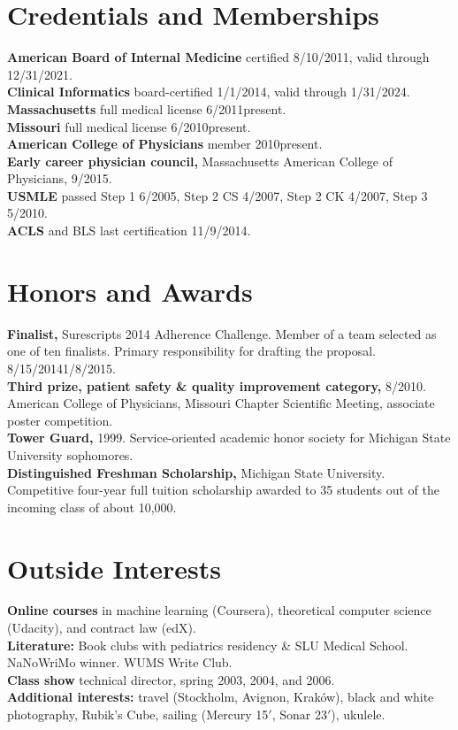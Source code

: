 \documentclass[10pt]{article}
\begin{document}
\section*{Credentials and Memberships}
\textbf{American Board of Internal Medicine} certified 8/10/2011,
valid through 12/31/2021.\\
\textbf{Clinical Informatics} board-certified 1/1/2014, valid through
1/31/2024.\\
\textbf{Massachusetts} full medical license 6/2011\ndash{}present.\\
\textbf{Missouri} full medical license 6/2010\ndash{}present.\\
\textbf{American College of Physicians} member 2010\ndash{}present.\\
\textbf{Early career physician council,} Massachusetts American
College of Physicians, 9/\ndash{}2015.\\
\textbf{USMLE} passed Step 1 6/2005, Step 2 CS 4/2007, Step 2 CK
4/2007, Step 3 5/2010.\\
\textbf{ACLS} and BLS last certification 11/9/2014.

\section*{Honors and Awards}

\textbf{Finalist,} Surescripts 2014 Adherence Challenge. Member of a
team selected as one of ten finalists. Primary responsibility for
drafting the proposal. 8/15/2014\ndash{}1/8/2015.\\
\textbf{Third prize, patient safety \& quality improvement category,}
8/2010. American College of Physicians, Missouri Chapter Scientific
Meeting, associate poster competition.\\
\textbf{Tower Guard,} 1999. Service-oriented academic honor
society for Michigan State University sophomores.\\
\textbf{Distinguished Freshman Scholarship,} Michigan State
University. Competitive four-year full tuition scholarship awarded to
35 students out of the incoming class of about 10,000.

\section*{Outside Interests}

\textbf{Online courses} in machine learning (Coursera), theoretical
computer science (Udacity), and contract law (edX).\\
\textbf{Literature:} Book clubs with pediatrics residency \& SLU
Medical School. NaNoWriMo winner. WUMS Write Club.\\
\textbf{Class show} technical director, spring 2003, 2004, and 2006.\\
\textbf{Additional interests:} travel (Stockholm, Avignon, Krak\'ow),
black and white photography, Rubik’s Cube, sailing (Mercury 15$'$,
Sonar 23$'$), ukulele.
\end{document}
